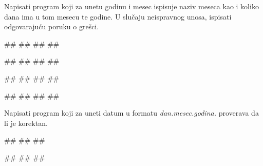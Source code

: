 \begin{Exercise}[label=KT_NG_27] 
Napisati program koji za unetu godinu i mesec ispisuje naziv meseca kao i koliko dana ima u tom mesecu te godine.
U slučaju neispravnog unosa, ispisati odgovarajuću poruku o grešci. 

\begin{miditest}
\begin{upotreba}{1}
#\naslovInt#
##
##
##
\end{upotreba}
\end{miditest}
\begin{miditest}
\begin{upotreba}{2}
#\naslovInt#
##
##
##
\end{upotreba}
\end{miditest}

\begin{miditest}
\begin{upotreba}{3}
#\naslovInt#
##
##
##
\end{upotreba}
\end{miditest}
\begin{miditest}
\begin{upotreba}{4}
#\naslovInt#
##
##
##
\end{upotreba}
\end{miditest}

\end{Exercise}
\ifresenja
 \begin{Answer}[ref=KT_NG_27]
\end{Answer}
\fi


\begin{Exercise}[label=KT_NG_28] 
 Napisati program koji za uneti datum u formatu \textit{dan.mesec.godina.} proverava da li je korektan.
 
\begin{miditest}
\begin{upotreba}{1}
#\naslovInt#
##
##
\end{upotreba}
\end{miditest}
\begin{miditest}
\begin{upotreba}{2}
#\naslovInt#
##
##
\end{upotreba}
\end{miditest}

\end{Exercise}
\ifresenja
 \begin{Answer}[ref=KT_NG_28]
\end{Answer}
\fi



